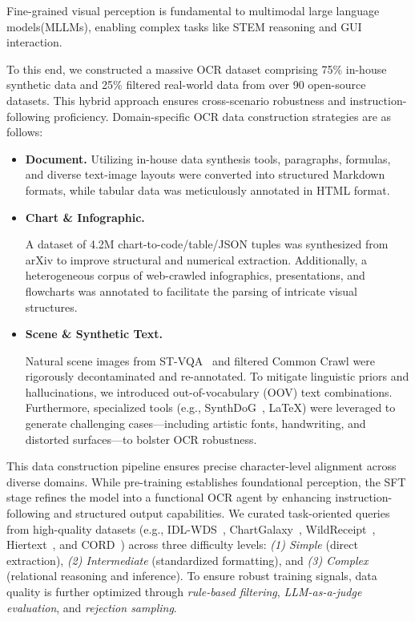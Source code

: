 \documentclass{article}
\begin{document}
Fine-grained visual perception is fundamental to multimodal large language models(MLLMs), enabling complex tasks like STEM reasoning and GUI interaction.

To this end, we constructed a massive OCR dataset comprising 75\% in-house synthetic data and 25\% filtered real-world data from over 90 open-source datasets. This hybrid approach ensures cross-scenario robustness and instruction-following proficiency. Domain-specific OCR data construction strategies are as follows:



\begin{itemize}

\item \textbf{{Document.}} Utilizing in-house data synthesis tools, paragraphs, formulas, and diverse text-image layouts were converted into structured Markdown formats, while tabular data was meticulously annotated in HTML format.


\item \textbf{{Chart \& Infographic.}} 

A dataset of 4.2M chart-to-code/table/JSON tuples was synthesized from arXiv to improve structural and numerical extraction. Additionally, a heterogeneous corpus of web-crawled infographics, presentations, and flowcharts was annotated to facilitate the parsing of intricate visual structures.

    
\item \textbf{{Scene \& Synthetic Text.}} 

Natural scene images from ST-VQA~\cite{biten2019scene} and filtered Common Crawl were rigorously decontaminated and re-annotated. To mitigate linguistic priors and hallucinations, we introduced out-of-vocabulary (OOV) text combinations. Furthermore, specialized tools (e.g., SynthDoG~\cite{kim2022ocr}, \LaTeX) were leveraged to generate challenging cases—including artistic fonts, handwriting, and distorted surfaces—to bolster OCR robustness.
\end{itemize}


This data construction pipeline ensures precise character-level alignment across diverse domains. While pre-training establishes foundational perception, the SFT stage refines the model into a functional OCR agent by enhancing instruction-following and structured output capabilities. We curated task-oriented queries from high-quality datasets (e.g., IDL-WDS~\cite{biten2022ocr}, ChartGalaxy~\cite{li2025chartgalaxy}, WildReceipt~\cite{sun2021spatial}, Hiertext~\cite{long2022towards}, and CORD~\cite{park2019cord}) across three difficulty levels: \textit{(1) Simple} (direct extraction), \textit{(2) Intermediate} (standardized formatting), and \textit{(3) Complex} (relational reasoning and inference). To ensure robust training signals, data quality is further optimized through \textit{rule-based filtering}, \textit{LLM-as-a-judge evaluation}, and \textit{rejection sampling}.
\end{document}
